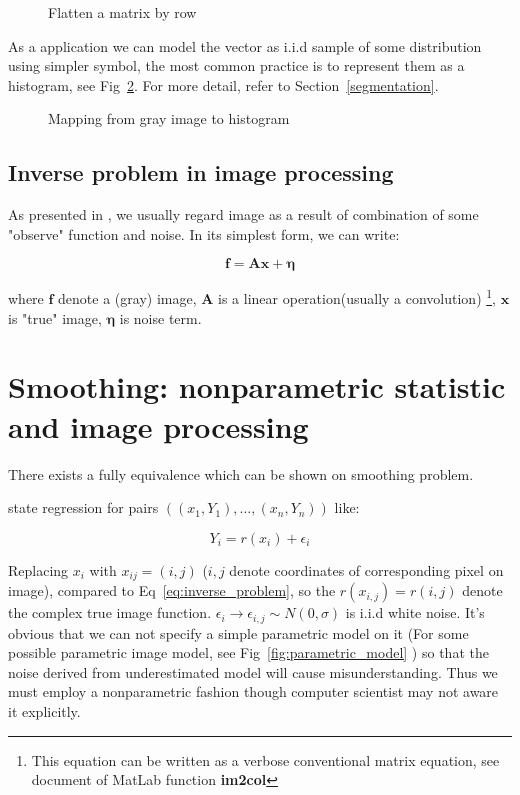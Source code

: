 \documentclass{article}
\begin{document}
\begin{figure}[htb]
  \centering
  
  \caption{Flatten a matrix by row}
  \label{fig:flatten_matrix}
\end{figure}


As a application we can model the vector as i.i.d sample of some distribution using simpler symbol, the most 
common practice is to represent them as a histogram, see Fig~\ref{fig:map_gray_to_hist}. 
For more detail, refer to Section~\ref{segmentation}.

\begin{figure}[htb]
  \centering
  
  \caption{Mapping from gray image to histogram}
  \label{fig:map_gray_to_hist}
\end{figure}

\subsection{Inverse problem in image processing}

As presented in \cite{dong2015image}, we usually regard image as a result of combination of some "observe"
function and noise. In its simplest form, we can write:

\begin{equation}
\mathbf{f} = \mathbf{A} \mathbf{x} + \mathbf{\eta}
\label{eq:inverse_problem}
\end{equation}

where $\mathbf{f}$ denote a (gray) image, $\mathbf{A}$ is a linear operation(usually a convolution)
\footnote{This equation can be written as a verbose conventional matrix equation, 
see document of MatLab function \bf{im2col}}, 
$\mathbf{x}$ is "true" image, $\mathbf{\eta}$ is noise term.
 
\section{Smoothing: nonparametric statistic and image processing}

There exists a fully equivalence which can be shown on smoothing problem.

\cite{wasserman2006all} state regression for pairs $((x_1,Y_1),\dots,(x_n,Y_n))$ like:

$$
Y_i = r(x_i) + \epsilon_i
$$

Replacing $x_i$ with $x_{ij}=(i,j)$ ($i,j$ denote coordinates of corresponding pixel on image), compared to Eq~\ref{eq:inverse_problem},
so the $r(x_{i,j})=r(i,j)$ denote the complex true image function. $\epsilon_i \to \epsilon_{i,j} \sim N(0,\sigma)$ is i.i.d white noise.
It's obvious that we can not specify a simple parametric model on it (For some possible parametric image model,
see Fig~\ref{fig:parametric_model} ) so that the noise derived from underestimated model will cause misunderstanding. 
Thus we must employ a nonparametric fashion though computer scientist may not aware it explicitly.
\end{document}
